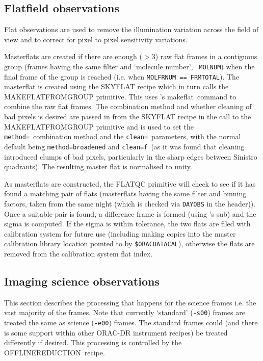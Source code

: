 \documentclass[twoside,11pt]{article}
\newcommand{\xref}[3]{#1}
\renewcommand{\_}{\texttt{\symbol{95}}}
\newcommand{\CCDPACK}{\xref{{\sc{Ccdpack}}}{sun139}{}}
\newcommand{\KAPPA}{\xref{{\sc{Kappa}}}{sun95}{}}
\newcommand{\task}[1]{\textsf{#1}}
\newcommand{\makeflat}{\xref{\task{makeflat}}{sun139}{MAKEFLAT}}
\newcommand{\aparam}[1]{\texttt{#1}}     %
\begin{document}
\subsection{Flatfield observations}

Flat observations are used to remove the illumination variation across the field
of view and to correct for pixel to pixel sensitivity variations.

Masterflats are created if there are enough ($>3$) raw flat frames in a
contiguous group (frames having the same filter and `molecule number', \texttt{
MOLNUM}) when the final frame of the group is reached (i.e. when  \texttt{MOLFRNUM
==  FRMTOTAL}). The masterflat is created using the \task{SKY\_FLAT} recipe
which in turn calls the \task{\_MAKE\_FLAT\_FROM\_GROUP\_} primitive. This uses
\CCDPACK's \makeflat\ command to combine the raw flat frames. The combination
method and whether cleaning of bad pixels is desired are passed in from the \task{SKY\_FLAT} recipe in the call to the
\task{\_MAKE\_FLAT\_FROM\_GROUP\_} primitive and is used to set the
\aparam{method=}\ combination method and the \aparam{clean=}\ parameters, with the normal default being
\aparam{method=broadened} and \aparam{clean=f}\  (as it was found that cleaning
introduced clumps of bad pixels, particularly in the sharp edges between
Sinistro quadrants). The resulting master flat is normalised to unity.

As masterflats are constructed, the \task{\_FLAT\_QC\_} primitive will check to
see if it has found a matching pair of flats (masterflats having the same filter
and binning factors, taken from the same night (which is checked via \texttt{DAYOBS} in
the header)). Once a suitable pair is found, a difference frame is formed (using
\KAPPA's \task{sub}) and the sigma is computed. If the sigma is within
tolerance, the two flats are filed with calibration system for future use
(including making copies into the master calibration library location pointed to
by \texttt{\$ORAC\_DATA\_CAL}), otherwise the flats are removed from the
calibration system flat index.


\subsection{Imaging science observations}

This section describes the processing that happens for the science frames i.e.
the vast majority of the frames. Note that currently `standard' 
(\texttt{-s00}) frames are treated the same as science (\texttt{-e00}) frames.
The standard frames could (and there is some support within other ORAC-DR
instrument recipes) be treated differently if desired. This processing is
controlled by the \task{OFFLINE\_REDUCTION}\ recipe.
\end{document}
